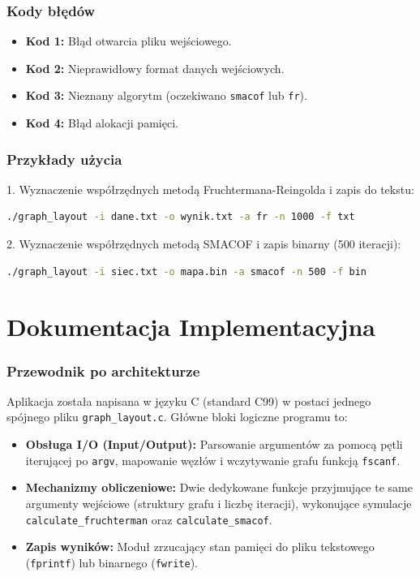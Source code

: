\documentclass[12pt,a4paper]{article}
\begin{document}
\section{Kody błędów}
\begin{itemize}
    \item \textbf{Kod 1:} Błąd otwarcia pliku wejściowego.
    \item \textbf{Kod 2:} Nieprawidłowy format danych wejściowych.
    \item \textbf{Kod 3:} Nieznany algorytm (oczekiwano \texttt{smacof} lub \texttt{fr}).
    \item \textbf{Kod 4:} Błąd alokacji pamięci.
\end{itemize}

\section{Przykłady użycia}
1. Wyznaczenie współrzędnych metodą Fruchtermana-Reingolda i zapis do tekstu:
\begin{lstlisting}[language=bash]
./graph_layout -i dane.txt -o wynik.txt -a fr -n 1000 -f txt
\end{lstlisting}

2. Wyznaczenie współrzędnych metodą SMACOF i zapis binarny (500 iteracji):
\begin{lstlisting}[language=bash]
./graph_layout -i siec.txt -o mapa.bin -a smacof -n 500 -f bin
\end{lstlisting}

\newpage
\part{Dokumentacja Implementacyjna}

\section{Przewodnik po architekturze}
Aplikacja została napisana w języku C (standard C99) w postaci jednego spójnego pliku \texttt{graph\_layout.c}. Główne bloki logiczne programu to:
\begin{itemize}
    \item \textbf{Obsługa I/O (Input/Output):} Parsowanie argumentów za pomocą pętli iterującej po \texttt{argv}, mapowanie węzłów i wczytywanie grafu funkcją \texttt{fscanf}.
    \item \textbf{Mechanizmy obliczeniowe:} Dwie dedykowane funkcje przyjmujące te same argumenty wejściowe (struktury grafu i liczbę iteracji), wykonujące symulacje \texttt{calculate\_fruchterman} oraz \texttt{calculate\_smacof}.
    \item \textbf{Zapis wyników:} Moduł zrzucający stan pamięci do pliku tekstowego (\texttt{fprintf}) lub binarnego (\texttt{fwrite}).
\end{itemize}
\end{document}
